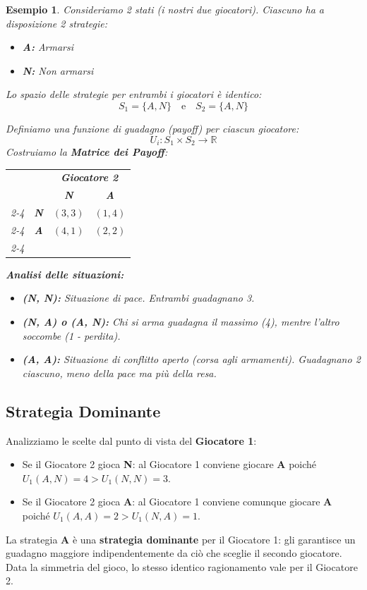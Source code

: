 \documentclass[openany]{book}
\newtheorem*{esempio}{Esempio}
\theoremstyle{definition}
\theoremstyle{remark}
\newcommand{\R}{\mathbb{R}}
\begin{document}
\begin{esempio}
Consideriamo 2 stati (i nostri due giocatori). Ciascuno ha a disposizione 2 strategie:
\begin{itemize}
    \item \textbf{A:} Armarsi
    \item \textbf{N:} Non armarsi
\end{itemize}
Lo spazio delle strategie per entrambi i giocatori è identico:
$$ S_1 = \{A, N\} \quad \text{e} \quad S_2 = \{A, N\} $$

Definiamo una funzione di guadagno (payoff) per ciascun giocatore:
$$ U_i : S_1 \times S_2 \to \R $$
Costruiamo la \textbf{Matrice dei Payoff}:

\vspace{0.4cm}
\begin{center}
\renewcommand{\arraystretch}{1.5}
\begin{tabular}{cc|c|c|}
& \multicolumn{1}{c}{} & \multicolumn{2}{c}{\textbf{Giocatore 2}} \\
& \multicolumn{1}{c}{} & \multicolumn{1}{c}{\textbf{N}} & \multicolumn{1}{c}{\textbf{A}} \\ \cline{2-4}
\multirow{2}{*}{\rotatebox{90}{\textbf{Gioc. 1}}} 
& \textbf{N} & $(3, 3)$ & $(1, 4)$ \\ \cline{2-4}
& \textbf{A} & $(4, 1)$ & $(2, 2)$ \\ \cline{2-4}
\end{tabular}
\end{center}
\vspace{0.4cm}

\textbf{Analisi delle situazioni:}
\begin{itemize}
    \item \textbf{(N, N):} Situazione di pace. Entrambi guadagnano 3.
    \item \textbf{(N, A) o (A, N):} Chi si arma guadagna il massimo (4), mentre l'altro soccombe (1 - perdita).
    \item \textbf{(A, A):} Situazione di conflitto aperto (corsa agli armamenti). Guadagnano 2 ciascuno, meno della pace ma più della resa.
\end{itemize}
\end{esempio}

\subsection*{Strategia Dominante}

Analizziamo le scelte dal punto di vista del \textbf{Giocatore 1}:
\begin{itemize}
    \item Se il Giocatore 2 gioca \textbf{N}: al Giocatore 1 conviene giocare \textbf{A} poiché $U_1(A,N) = 4 > U_1(N,N) = 3$.
    \item Se il Giocatore 2 gioca \textbf{A}: al Giocatore 1 conviene comunque giocare \textbf{A} poiché $U_1(A,A) = 2 > U_1(N,A) = 1$.
\end{itemize}
La strategia \textbf{A} è una \textbf{strategia dominante} per il Giocatore 1: gli garantisce un guadagno maggiore indipendentemente da ciò che sceglie il secondo giocatore. Data la simmetria del gioco, lo stesso identico ragionamento vale per il Giocatore 2.
\end{document}
